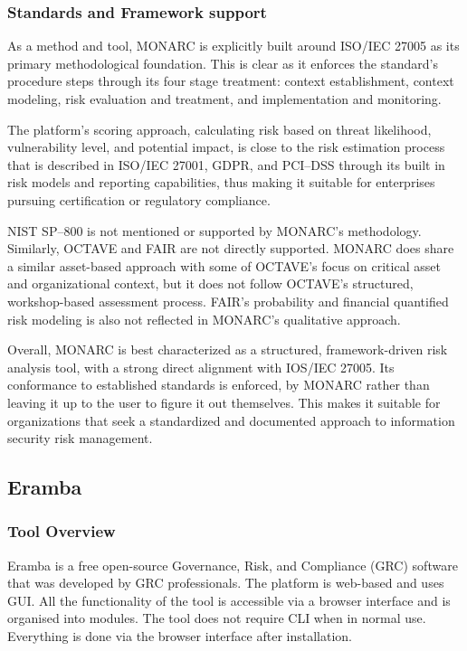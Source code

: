 \subsubsection{Standards and Framework support}
As a method and tool, MONARC is explicitly built around ISO/IEC 27005 as its primary methodological foundation. This is clear as it enforces the standard's procedure steps through its four stage treatment: context establishment, context modeling, risk evaluation and treatment, and implementation and monitoring. 

The platform's scoring approach, calculating risk based on threat likelihood, vulnerability level, and potential impact, is close to the risk estimation process that is described in ISO/IEC 27001, GDPR, and PCI--DSS through its built in risk models and reporting capabilities, thus making it suitable for enterprises pursuing certification or regulatory compliance. 

NIST SP--800 is not mentioned or supported by MONARC's methodology. Similarly, OCTAVE and FAIR are not directly supported. MONARC does share a similar asset-based approach with some of OCTAVE's focus on critical asset and organizational context, but it does not follow OCTAVE's structured, workshop-based assessment process. FAIR's probability and financial quantified risk modeling is also not reflected in MONARC's qualitative approach.

Overall, MONARC is best characterized as a structured, framework-driven risk analysis tool, with a strong direct alignment with IOS/IEC 27005. Its conformance to established standards is enforced, by MONARC rather than leaving it up to the user to figure it out themselves. This makes it suitable for organizations that seek a standardized and documented approach to information security risk management. 

\subsubsection{}

\subsection{Eramba}
\subsubsection{Tool Overview}
Eramba is a free open-source Governance, Risk, and Compliance (GRC) software that was developed by GRC professionals. The platform is web-based and uses GUI. All the functionality of the tool is accessible via a browser interface and is organised into modules. The tool does not require CLI when in normal use. Everything is done via the browser interface after installation.

